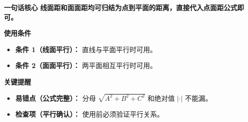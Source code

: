 \begin{summarybox}
	\textbf{\textcolor{CSummary}{一句话核心}}
	\textbf{线面距和面面距均可归结为点到平面的距离，直接代入点面距公式即可。}

	\medskip
	\textbf{\textcolor{CSummary}{使用条件}}
	\begin{itemize}[leftmargin=*, itemsep=0.5em, topsep=0.4em]
		\item \textbf{条件 1（线面平行）：} 直线与平面平行时可用。
		\item \textbf{条件 2（面面平行）：} 两平面相互平行时可用。
	\end{itemize}

	\medskip
	\textbf{\textcolor{CSummary}{关键提醒}}
	\begin{itemize}[leftmargin=*, itemsep=0.5em, topsep=0.4em]
		\item \textbf{易错点（公式完整）：} 分母 $\sqrt{A^2+B^2+C^2}$ 和绝对值 $\left| \cdot \right|$ 不能漏。
		\item \textbf{检查项（平行确认）：} 使用前必须验证平行关系。
	\end{itemize}

\end{summarybox}
